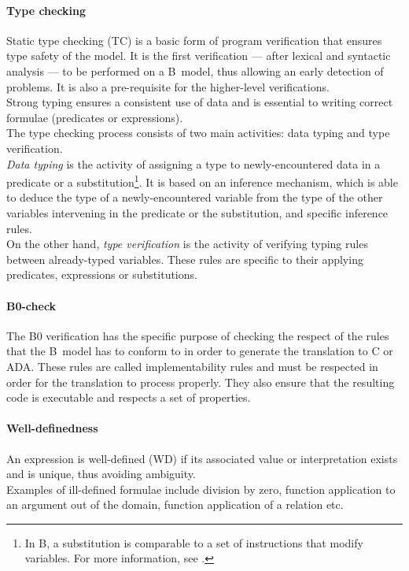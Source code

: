 \paragraph{Type checking}
Static type checking (TC) is a basic form of program verification that ensures type safety of the model. It is the first verification --- after lexical and syntactic analysis --- to be performed on a B~model, thus allowing an early detection of problems. It is also a pre-requisite for the higher-level verifications. \\
Strong typing ensures a consistent use of data and is essential to writing correct formulae (predicates or expressions).\\

The type checking process consists of two main activities: data typing and type verification.\\
{\itshape Data typing} is the activity of assigning a type to newly-encountered data in a predicate or a substitution\footnote{In B, a substitution is comparable to a set of instructions that modify variables. For more information, see \cite{bbook}.}. It is based on an inference mechanism, which is able to deduce the type of a newly-encountered variable from the type of the other variables intervening in the predicate or the substitution, and specific inference rules.\\
On the other hand, {\itshape type verification} is the activity of verifying typing rules between already-typed variables. These rules are specific to their applying predicates, expressions or substitutions.

\paragraph{B0-check}
The B0 verification has the specific purpose of checking the respect of the rules that the B~model has to conform to in order to generate the translation to C or ADA. These rules are called implementability rules and must be respected in order for the translation to process properly. They also ensure that the resulting code is executable and respects a set of properties.

\paragraph{Well-definedness}
An expression is well-defined (WD) if its associated value or interpretation exists and is unique, thus avoiding ambiguity.\\
Examples of ill-defined formulae include division by zero, function application to an argument out of the domain, function application of a relation etc.\\

